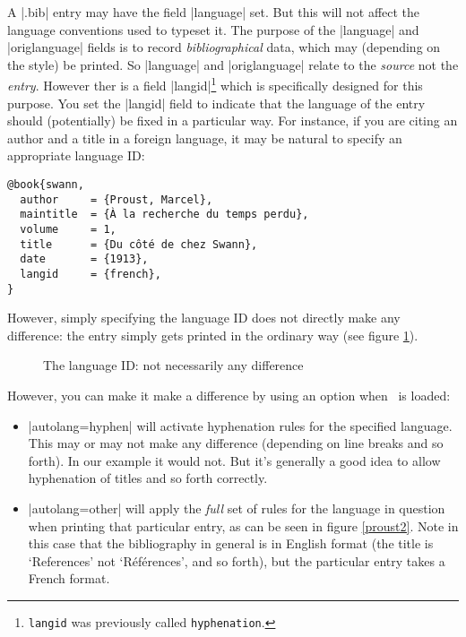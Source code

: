 A |.bib| entry may have the field |language| set. But this will not
affect the language conventions used to typeset it. The purpose of the
|language| and |origlanguage| fields is to record
\emph{bibliographical} data, which may (depending on the style) be
printed. So |language| and
|origlanguage| relate to the \emph{source} not the
\emph{entry}. However ther is a field
|langid|\footnote{\texttt{langid} was previously called
  \texttt{hyphenation}.} which is specifically designed for this
purpose. You set the |langid| field to indicate that the language of
the entry should (potentially) be fixed in a particular way. For
instance, if you are citing an author and a title in a foreign
language, it may be natural to specify an appropriate language ID:

\begin{verbatim}
@book{swann,
  author     = {Proust, Marcel},
  maintitle  = {À la recherche du temps perdu},
  volume     = 1,
  title      = {Du côté de chez Swann},
  date       = {1913},
  langid     = {french},
}
\end{verbatim}

However, simply specifying the language ID does not directly make any
difference: the entry simply gets printed in the ordinary way (see
figure \ref{proust1}).
\begin{figure}
\caption{The language ID: not necessarily any difference\label{proust1}}
\end{figure}

However, you can make it make a difference by using an option when
\biblatex\ is loaded:
\begin{itemize}
\item |autolang=hyphen| will activate hyphenation rules for the
  specified language. This may or may not make any difference
  (depending on line breaks and so forth). In our example it would
  not. But it's generally a good idea to allow hyphenation of titles
  and so forth correctly.
\item |autolang=other| will apply the \emph{full} set of rules for the
  language in question when printing that particular entry, as can be
  seen in figure \ref{proust2}. Note in this case that the
  bibliography in general is in English format (the title is
  `References' not `Références', and so forth), but the particular
  entry takes a French format.
\end{itemize}

